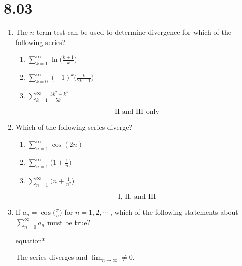 \documentclass[12pt]{article}
\begin{document}
\section*{8.03}
\begin{enumerate}
	\item The $n$ term test can be used to determine divergence for which of the following series?
	      \begin{enumerate}[label=\Roman*.]
	      	\item $\sum_{k=1}^{\infty} \ln\big(\frac{k+1}{k}\big)$
	      	\item $\sum_{k=0}^{\infty} (-1)^k \big(\frac{k}{2k+1}\big)$
	      	\item $\sum_{k=1}^{\infty} \frac{3k^2-k^3}{5k^3}$
	      \end{enumerate}
		  $$\boxed{\text{II and III only}}$$
	\item Which of the following series diverge?
	      \begin{enumerate}[label=\Roman*.]
	      	\item $\sum_{n=1}^{\infty} \cos(2n)$
	      	\item $\sum_{n=1}^{\infty} \big(1+\frac{1}{n}\big)$
	      	\item $\sum_{n=1}^{\infty} \big(n+\frac{1}{n^2}\big)$
	      \end{enumerate}
		  $$\boxed{\text{I, II, and III}}$$
	\item If $a_n=\cos\big(\frac{\pi}{n}\big)$ for $n=1,2,\cdots$ , which of the following statements about $\sum_{n=0}^{\infty} a_n$ must be true?
	\begin{empheq}[box=\tcbhighmath]{equation*}
		\parbox{3in}{The series diverges and $\lim_{n\to\infty}\neq 0$.}
	\end{empheq}
\end{enumerate}
\end{document}
